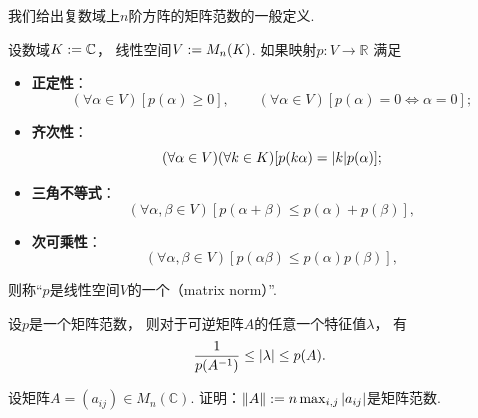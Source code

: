 我们给出复数域上\(n\)阶方阵的矩阵范数的一般定义.
\begin{definition}
设数域\(K := \mathbb{C}\)，
线性空间\(V := M_n(K)\).
如果映射\(p\colon V \to \mathbb{R}\)
满足\begin{itemize}
	\item {\rm\bf 正定性}：\begin{equation*}
		(\forall \alpha \in V)
		[p(\alpha) \geq 0],
		\qquad
		(\forall \alpha \in V)
		[
			p(\alpha) = 0
			\iff
			\alpha = 0
		];
	\end{equation*}

	\item {\rm\bf 齐次性}：\begin{equation*}
		(\forall \alpha \in V)
		(\forall k \in K)
		[
			p(k \alpha) = \abs{k} p(\alpha)
		];
	\end{equation*}

	\item {\rm\bf 三角不等式}：\begin{equation*}
		(\forall \alpha,\beta \in V)
		[
			p(\alpha+\beta) \leq p(\alpha) + p(\beta)
		],
	\end{equation*}

	\item {\rm\bf 次可乘性}：\begin{equation*}
		(\forall \alpha,\beta \in V)
		[
			p(\alpha \beta) \leq p(\alpha) p(\beta)
		],
	\end{equation*}
\end{itemize}
则称“\(p\)是线性空间\(V\)的一个（matrix norm）”.
\end{definition}

\begin{property}
设\(p\)是一个矩阵范数，
则对于可逆矩阵\(A\)的任意一个特征值\(\lambda\)，
有\begin{equation*}
	\frac{1}{p(A^{-1})} \leq \abs{\lambda} \leq p(A).
\end{equation*}
\end{property}

\begin{example}
设矩阵\(A = (a_{ij}) \in M_n(\mathbb{C})\).
证明：\(\norm{A} := n \max_{i,j} \abs{a_{ij}}\)是矩阵范数.
\end{example}

